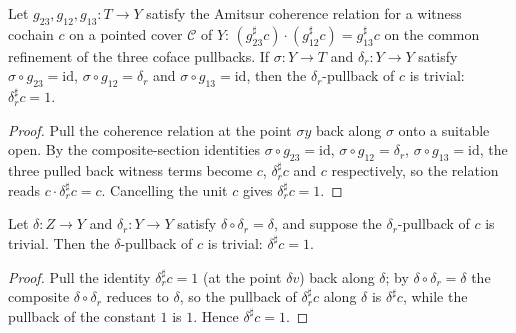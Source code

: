 \begin{theorem}
  \label{pa-thm:unitsAppLE_eq_one_of_coherent}
  \leanok

  Let \(g_{23}, g_{12}, g_{13} \colon T \to Y\) satisfy the Amitsur coherence relation for a
  witness cochain \(c\) on a pointed cover \(\mathcal C\) of \(Y\):
  \((g_{23}^{\sharp} c) \cdot (g_{12}^{\sharp} c) = g_{13}^{\sharp} c\) on the common
  refinement of the three coface pullbacks. If \(\sigma \colon Y \to T\) and \(\delta_r \colon
  Y \to Y\) satisfy \(\sigma \circ g_{23} = \mathrm{id}\), \(\sigma \circ g_{12} = \delta_r\)
  and \(\sigma \circ g_{13} = \mathrm{id}\), then the \(\delta_r\)-pullback of \(c\) is
  trivial: \(\delta_r^{\sharp} c = 1\).
\end{theorem}
\begin{proof}
  \leanok
  Pull the coherence relation at the point \(\sigma y\) back along \(\sigma\) onto a suitable
  open. By the composite-section identities \(\sigma \circ g_{23} = \mathrm{id}\),
  \(\sigma \circ g_{12} = \delta_r\), \(\sigma \circ g_{13} = \mathrm{id}\), the three pulled
  back witness terms become \(c\), \(\delta_r^{\sharp} c\) and \(c\) respectively, so the
  relation reads \(c \cdot \delta_r^{\sharp} c = c\). Cancelling the unit \(c\) gives
  \(\delta_r^{\sharp} c = 1\).
\end{proof}

\begin{theorem}
  \label{pa-thm:unitsAppLE_diag_eq_one_of_coherent}
  \leanok

  Let \(\delta \colon Z \to Y\) and \(\delta_r \colon Y \to Y\) satisfy \(\delta \circ
  \delta_r = \delta\), and suppose the \(\delta_r\)-pullback of \(c\) is trivial. Then the
  \(\delta\)-pullback of \(c\) is trivial: \(\delta^{\sharp} c = 1\).
\end{theorem}
\begin{proof}
  \leanok
  Pull the identity \(\delta_r^{\sharp} c = 1\) (at the point \(\delta v\)) back along
  \(\delta\); by \(\delta \circ \delta_r = \delta\) the composite \(\delta \circ \delta_r\)
  reduces to \(\delta\), so the pullback of \(\delta_r^{\sharp} c\) along \(\delta\) is
  \(\delta^{\sharp} c\), while the pullback of the constant \(1\) is \(1\). Hence
  \(\delta^{\sharp} c = 1\).
\end{proof}

